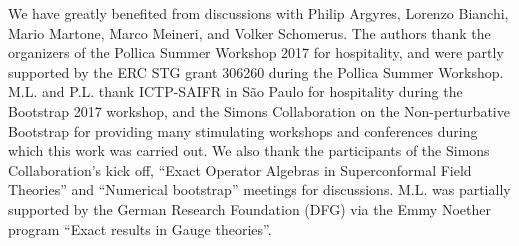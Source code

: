 
\acknowledgments

We have greatly benefited from discussions with
Philip Argyres,
Lorenzo Bianchi,
Mario Martone,
Marco Meineri,
and 
Volker Schomerus.
The authors thank the organizers of the Pollica Summer Workshop 2017 for hospitality, and were partly supported by the ERC STG grant 306260 during the Pollica Summer Workshop.
M.L. and P.L. thank ICTP-SAIFR in S\~{a}o  Paulo for hospitality during the Bootstrap 2017 workshop, and the Simons Collaboration on the Non-perturbative Bootstrap for providing many stimulating workshops and conferences during which this work was carried out. We also thank the participants of the Simons Collaboration's kick off, ``Exact Operator Algebras in Superconformal Field Theories'' and ``Numerical bootstrap'' meetings for discussions. M.L. was partially supported  by the German Research Foundation (DFG) via the Emmy Noether program ``Exact results in Gauge theories''.